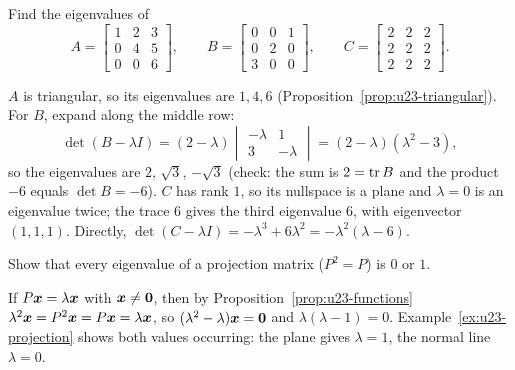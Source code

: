 \begin{exercise}\label{exr:u23-ABC}
Find the eigenvalues of
\[
  A=\begin{bmatrix} 1&2&3\\ 0&4&5\\ 0&0&6\end{bmatrix},\qquad
  B=\begin{bmatrix} 0&0&1\\ 0&2&0\\ 3&0&0\end{bmatrix},\qquad
  C=\begin{bmatrix} 2&2&2\\ 2&2&2\\ 2&2&2\end{bmatrix}.
\]
\end{exercise}
\begin{solution}
$A$ is triangular, so its eigenvalues are $1,4,6$
(Proposition~\ref{prop:u23-triangular}). For $B$, expand along the middle row:
\[
  \det(B-\lambda I)=(2-\lambda)\begin{vmatrix} -\lambda & 1\\ 3 & -\lambda\end{vmatrix}
  =(2-\lambda)(\lambda^{2}-3),
\]
so the eigenvalues are $2$, $\sqrt3$, $-\sqrt3$ (check: the sum is $2=\operatorname{tr} B$ and the product
$-6$ equals $\det B=-6$). $C$ has rank $1$, so its nullspace is a plane and $\lambda=0$ is an
eigenvalue twice; the trace $6$ gives the third eigenvalue $6$, with eigenvector $(1,1,1)$.
Directly, $\det(C-\lambda I)=-\lambda^{3}+6\lambda^{2}=-\lambda^{2}(\lambda-6)$.
\end{solution}

\begin{exercise}\label{exr:u23-idempotent}
Show that every eigenvalue of a projection matrix ($P^{2}=P$) is $0$ or $1$.
\end{exercise}
\begin{solution}
If $P\boldsymbol{x}=\lambda\boldsymbol{x}$ with $\boldsymbol{x}\neq\boldsymbol{0}$, then by
Proposition~\ref{prop:u23-functions} $\lambda^{2}\boldsymbol{x}=P^{2}\boldsymbol{x}=P\boldsymbol{x}=\lambda\boldsymbol{x}$,
so $(\lambda^{2}-\lambda)\boldsymbol{x}=\boldsymbol{0}$ and $\lambda(\lambda-1)=0$. Example~\ref{ex:u23-projection}
shows both values occurring: the plane gives $\lambda=1$, the normal line $\lambda=0$.
\end{solution}

